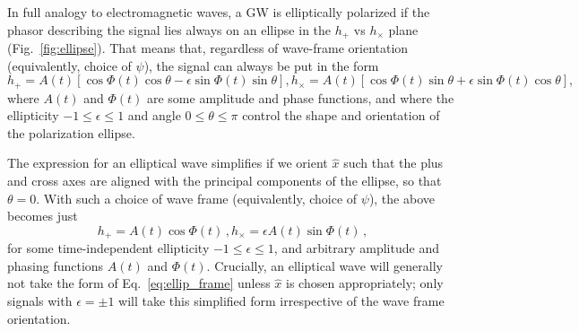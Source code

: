\documentclass[aps,prd,twocolumn,superscriptaddress,preprintnumbers,floatfix,nofootinbib]{revtex4-2}
\newcommand{\beq}{\begin{equation}}
\newcommand{\eeq}{\end{equation}}
\begin{document}
In full analogy to electromagnetic waves, a GW is elliptically polarized if the phasor describing the signal lies always on an ellipse in the $h_+$ vs $h_\times$ plane (Fig.~\ref{fig:ellipse}).
That means that, regardless of wave-frame orientation (equivalently, choice of $\psi$), the signal can always be put in the form
\begin{subequations} \label{eq:ellip}
\begin{equation} \label{eq:ellip_p}
h_+ = A(t) \left[\cos \Phi(t) \cos \theta - \epsilon \sin \Phi(t) \sin\theta \right] ,
\end{equation}
\begin{equation} \label{eq:ellip_c}
h_\times = A(t) \left[ \cos \Phi(t) \sin \theta + \epsilon \sin \Phi(t) \cos\theta \right] ,
\end{equation}
\end{subequations}
where $A(t)$ and $\Phi(t)$ are some amplitude and phase functions, and where the ellipticity $-1 \leq \epsilon \leq 1$ and angle $0 \leq \theta \leq \pi$ control the shape and orientation of the polarization ellipse.


The expression for an elliptical wave simplifies if we orient $\hat{x}$ such that the plus and cross axes are aligned with the principal components of the ellipse, so that $\theta = 0$.
With such a choice of wave frame (equivalently, choice of $\psi$), the above becomes just
\begin{subequations} \label{eq:ellip_frame}
\beq
h_+ = A(t) \cos \Phi(t) \, ,
\eeq
\beq
h_\times = \epsilon A(t) \sin \Phi(t)\, ,
\eeq
\end{subequations}
for some time-independent ellipticity $-1 \leq \epsilon \leq 1$, and arbitrary amplitude and phasing functions $A(t)$ and $\Phi(t)$.
Crucially, an elliptical wave will generally not take the form of Eq.~\eqref{eq:ellip_frame} unless $\hat{x}$ is chosen appropriately; only signals with $\epsilon=\pm1$ will take  this simplified form irrespective of the wave frame orientation.
\end{document}
